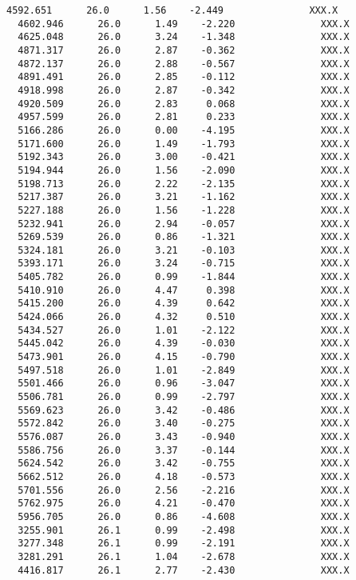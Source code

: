 \documentclass[11pt]{article}
\begin{document}
\begin{Verbatim}[commandchars=\\\{\}]
  4592.651      26.0      1.56    -2.449               XXX.X
  4602.946      26.0      1.49    -2.220               XXX.X
  4625.048      26.0      3.24    -1.348               XXX.X
  4871.317      26.0      2.87    -0.362               XXX.X
  4872.137      26.0      2.88    -0.567               XXX.X
  4891.491      26.0      2.85    -0.112               XXX.X
  4918.998      26.0      2.87    -0.342               XXX.X
  4920.509      26.0      2.83     0.068               XXX.X
  4957.599      26.0      2.81     0.233               XXX.X
  5166.286      26.0      0.00    -4.195               XXX.X
  5171.600      26.0      1.49    -1.793               XXX.X
  5192.343      26.0      3.00    -0.421               XXX.X
  5194.944      26.0      1.56    -2.090               XXX.X
  5198.713      26.0      2.22    -2.135               XXX.X
  5217.387      26.0      3.21    -1.162               XXX.X
  5227.188      26.0      1.56    -1.228               XXX.X
  5232.941      26.0      2.94    -0.057               XXX.X
  5269.539      26.0      0.86    -1.321               XXX.X
  5324.181      26.0      3.21    -0.103               XXX.X
  5393.171      26.0      3.24    -0.715               XXX.X
  5405.782      26.0      0.99    -1.844               XXX.X
  5410.910      26.0      4.47     0.398               XXX.X
  5415.200      26.0      4.39     0.642               XXX.X
  5424.066      26.0      4.32     0.510               XXX.X
  5434.527      26.0      1.01    -2.122               XXX.X
  5445.042      26.0      4.39    -0.030               XXX.X
  5473.901      26.0      4.15    -0.790               XXX.X
  5497.518      26.0      1.01    -2.849               XXX.X
  5501.466      26.0      0.96    -3.047               XXX.X
  5506.781      26.0      0.99    -2.797               XXX.X
  5569.623      26.0      3.42    -0.486               XXX.X
  5572.842      26.0      3.40    -0.275               XXX.X
  5576.087      26.0      3.43    -0.940               XXX.X
  5586.756      26.0      3.37    -0.144               XXX.X
  5624.542      26.0      3.42    -0.755               XXX.X
  5662.512      26.0      4.18    -0.573               XXX.X
  5701.556      26.0      2.56    -2.216               XXX.X
  5762.975      26.0      4.21    -0.470               XXX.X
  5956.705      26.0      0.86    -4.608               XXX.X
  3255.901      26.1      0.99    -2.498               XXX.X
  3277.348      26.1      0.99    -2.191               XXX.X
  3281.291      26.1      1.04    -2.678               XXX.X
  4416.817      26.1      2.77    -2.430               XXX.X

\end{Verbatim}
\end{document}
